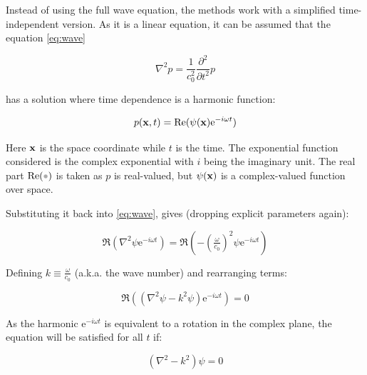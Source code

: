 
Instead of using the full wave equation, the methods work with a simplified
time-independent version. As it is a linear equation, it can be assumed that the
equation \ref{eq:wave}

\[ \nabla^2 p = \frac{1}{c^2_0}\frac{\partial^2}{\partial t^2} p \]

has a solution where time dependence is a harmonic function:

\begin{equation}
\label{eq:pressurepsi}
p(\mathrm{\mathbf{x}},t) = \operatorname{Re}(\psi(\mathrm{\mathbf{x}})\mathrm{e}^{-i\omega t})
\end{equation}

Here $\mathrm{\mathbf{x}}$ is the space coordinate while $t$ is the time. The exponential
function considered is the complex exponential with $i$ being the imaginary unit.
The real part $\Re(\parm)$ is taken as $p$ is real-valued, but $\psi(\mathrm{\mathbf{x}})$
is a complex-valued function over space.

Substituting it back into \ref{eq:wave}, gives
(dropping explicit parameters again):

\[ \Re(\nabla^2 \psi \mathrm{e}^{-i\omega t}) =
\Re(-(\tfrac{\omega}{c_0})^2 \psi \mathrm{e}^{-i\omega t})\]


Defining $k \equiv \tfrac{\omega}{c_0} $ (a.k.a. the wave number) and rearranging
terms:

\[ \Re((\nabla^2 \psi -k^2 \psi) \mathrm{e}^{-i\omega t}) = 0\]

As the harmonic $\mathrm{e}^{-i\omega t}$ is equivalent to a rotation in the complex
plane, the equation will be satisfied for all $t$ if:

\begin{equation}
\label{eq:helmholtz}
(\nabla^2 -k^2)\psi = 0 
\end{equation}

% 
% 
% 
% 
% 
% 

